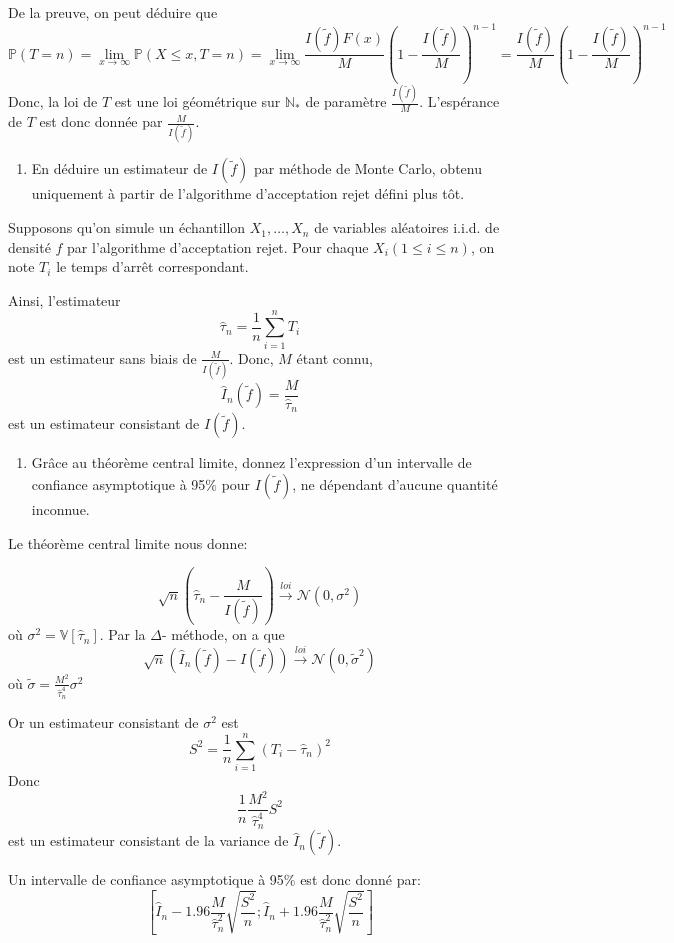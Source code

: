 \documentclass[
]{article}
\providecommand{\tightlist}{%
  \setlength{\itemsep}{0pt}\setlength{\parskip}{0pt}}
\newenvironment{Correction}%
  { \vspace{\baselineskip}\begin{mdframed}[backgroundcolor=my_green]}%
  {\end{mdframed}}
\begin{document}
\begin{Correction}
De la preuve, on peut déduire que 
$$\mathbb{P}\left(T = n \right) = \lim_{x \rightarrow \infty}\mathbb{P}\left(X\leq x, T = n \right) = \lim_{x \rightarrow \infty} \frac{I(\tilde{f})F(x)}{M}\left(1 - \frac{I(\tilde{f})}{M}\right)^{n - 1} =  \frac{I(\tilde{f})}{M}\left(1 - \frac{I(\tilde{f})}{M}\right)^{n - 1}$$
Donc, la loi de $T$ est une loi géométrique sur $\mathbb{N}_*$ de paramètre $\frac{I(\tilde{f})}{M}$. 
L'espérance de $T$ est donc donnée par $\frac{M}{I(\tilde{f})}$.
\end{Correction}

\begin{enumerate}
\def\labelenumi{\arabic{enumi}.}
\setcounter{enumi}{2}
\tightlist
\item
  En déduire un estimateur de \(I(\tilde{f})\) par méthode de Monte
  Carlo, obtenu uniquement à partir de l'algorithme d'acceptation rejet
  défini plus tôt.
\end{enumerate}

\begin{Correction}
Supposons qu'on simule un échantillon $X_1,\dots,X_n$ de variables aléatoires i.i.d.
de densité $f$ par l'algorithme d'acceptation rejet. Pour chaque $X_i (1\leq i\leq n)$, on note $T_i$ le temps d'arrêt correspondant.

Ainsi, l'estimateur 
$$\hat{\tau}_n = \frac{1}{n}\sum_{i = 1}^nT_i$$ 
est un estimateur sans biais de $\frac{M}{I(\tilde{f})}$. Donc, $M$  étant connu,
$$\hat{I}_n(\tilde{f}) = \frac{M}{\hat{\tau}_n}$$
est un estimateur consistant de $I(\tilde{f})$.
\end{Correction}

\begin{enumerate}
\def\labelenumi{\arabic{enumi}.}
\setcounter{enumi}{3}
\tightlist
\item
  Grâce au théorème central limite, donnez l'expression d'un intervalle
  de confiance asymptotique à 95\% pour \(I(\tilde{f})\), ne dépendant
  d'aucune quantité inconnue.
\end{enumerate}

\begin{Correction}
Le théorème central limite nous donne:

$$\sqrt{n}\left(\hat{\tau}_n - \frac{M}{I(\tilde{f})}\right) \overset{loi}{\longrightarrow} \mathcal{N}\left(0, \sigma^2\right)$$
où $\sigma^2 = \mathbb{V}\left[\hat{\tau}_n\right]$.
Par la $\Delta$- méthode, on a que
$$\sqrt{n}\left(\hat{I}_n(\tilde{f}) - I(\tilde{f})\right) \overset{loi}{\longrightarrow} \mathcal{N}\left(0, \tilde{\sigma}^2\right)$$
où $\tilde{\sigma} = \frac{M^2}{\hat{\tau}_n^4}\sigma^2$

Or un estimateur consistant de $\sigma^2$ est 
$$S^2 = \frac{1}{n}\sum_{i = 1}^n\left(T_i - \hat{\tau}_n \right)^2$$
Donc
$$\frac{1}{n}\frac{M^2}{\hat{\tau}_n^4}S^2$$
est un estimateur consistant de la variance de $\hat{I}_n(\tilde{f})$.

Un intervalle de confiance asymptotique à 95\% est donc donné par:
$$\left[\hat{I}_n - 1.96 \frac{M}{\hat{\tau}_n^2}\sqrt{\frac{S^2}{n}};
\hat{I}_n + 1.96 \frac{M}{\hat{\tau}_n^2}\sqrt{\frac{S^2}{n}}\right]$$
\end{Correction}
\end{document}
